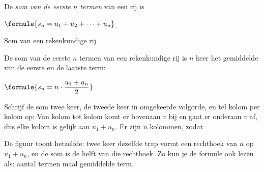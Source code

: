 \begin{theorie}
De \emph{som van de eerste $n$ termen} van een rij is

\qquad $\formule{s_n = u_1 + u_2 + \cdots + u_n}$

\begin{stelling}{Som van een rekenkundige rij}
\begin{minipage}[t]{.6\linewidth}
\vspace{0pt}
De som van de eerste $n$ termen van een rekenkundige rij is $n$ keer het gemiddelde van de eerste en de laatste term:

\vspace{1mm}
\qquad $\formule{s_n = n \cdot \dfrac{u_1 + u_n}{2}}$
\end{minipage}\hfill
\begin{minipage}[t]{.34\linewidth}
\vspace{0pt}
\end{minipage}
\end{stelling}

\begin{bewijs}
Schrijf de som twee keer, de tweede keer in omgekeerde volgorde, en tel kolom per kolom op:
Van kolom tot kolom komt er bovenaan $v$ bij en gaat er onderaan $v$ af, dus elke kolom is gelijk aan $u_1 + u_n$. Er zijn $n$ kolommen, zodat
\end{bewijs}
\end{theorie}

De figuur toont hetzelfde: twee keer dezelfde trap vormt een rechthoek van $n$ op $u_1 + u_n$, en de som is de helft van die rechthoek. Zo kun je de formule ook lezen als: aantal termen maal gemiddelde term.

